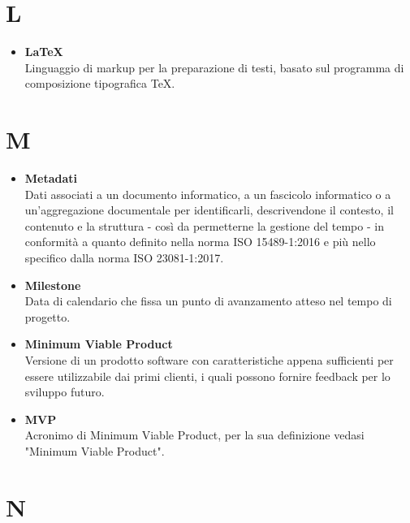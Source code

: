 \documentclass[a4paper,12pt]{article}
\begin{document}
        \section*{L} {
            \begin{itemize}
                \item \textbf{LaTeX}\\
                    Linguaggio di markup per la preparazione di testi, basato sul programma di composizione tipografica TeX.
            \end{itemize}
        }
        \newpage

        \section*{M} {
            \begin{itemize}
                \item \textbf{Metadati}\\
                    Dati associati a un documento informatico, a un fascicolo informatico o a un'aggregazione documentale per identificarli, descrivendone il contesto, il contenuto e la struttura - così da permetterne la gestione del tempo - in conformità a quanto definito nella norma ISO 15489-1:2016 e più nello specifico dalla norma ISO 23081-1:2017.
                \item \textbf{Milestone}\\
                    Data di calendario che fissa un punto di avanzamento atteso nel tempo di progetto.
                \item \textbf{Minimum Viable Product}\\
                    Versione di un prodotto software con caratteristiche appena sufficienti per essere utilizzabile dai primi clienti, i quali possono fornire feedback per lo sviluppo futuro.
                \item \textbf{MVP}\\
                    Acronimo di Minimum Viable Product, per la sua definizione vedasi "Minimum Viable Product".
            \end{itemize}
        }
        \newpage

        \section*{N} {
            
        }
        \newpage
\end{document}
